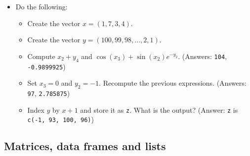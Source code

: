 \documentclass[]{book}
\providecommand{\tightlist}{%
  \setlength{\itemsep}{0pt}\setlength{\parskip}{0pt}}
\newenvironment{rmdblock}[1]
  {\begin{shaded*}
  \begin{itemize}
  \renewcommand{\labelitemi}{
    \raisebox{-.7\height}[0pt][0pt]{
      {\setkeys{Gin}{width=2em,keepaspectratio}\texttt{[image: img/icons/\#1]}}
    }
  }
  \item
  }
  {
  \end{itemize}
  \end{shaded*}
  }
\newenvironment{rmdexercise}
  {\begin{rmdblock}{exercise}}
  {\end{rmdblock}}
\begin{document}
\begin{rmdexercise}
Do the following:

\begin{itemize}
\tightlist
\item
  Create the vector \(x=(1, 7, 3, 4)\).
\item
  Create the vector \(y=(100, 99, 98, ..., 2, 1)\).
\item
  Compute \(x_2+y_4\) and \(\cos(x_3) + \sin(x_2) e^{-y_2}\). (Answers:
  \texttt{104}, \texttt{-0.9899925})
\item
  Set \(x_{3}=0\) and \(y_{2}=-1\). Recompute the previous expressions.
  (Answers: \texttt{97}, \texttt{2.785875})
\item
  Index \(y\) by \(x+1\) and store it as \texttt{z}. What is the output?
  (Answer: \texttt{z} is \texttt{c(-1,\ 93,\ 100,\ 96)})
\end{itemize}
\end{rmdexercise}

\subsection{Matrices, data frames and
lists}\label{matrices-data-frames-and-lists}
\end{document}
